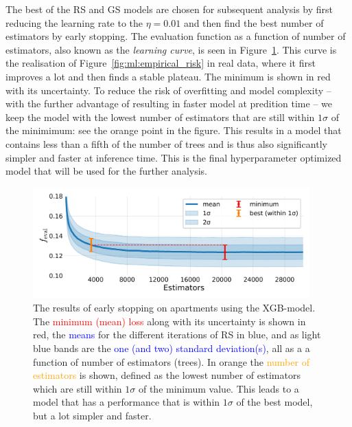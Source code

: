 The best of the RS and GS models are chosen for subsequent analysis by first reducing the learning rate to the $\eta=0.01$ and then find the best number of estimators by early stopping. The evaluation function as a function of number of estimators, also known as the \emph{learning curve}, is seen in Figure~\ref{fig:h:CV_res_ES_learning_curve_ejer}. This curve is the realisation of Figure~\ref{fig:ml:empirical_risk} in real data, where it first improves a lot and then finds a stable plateau. The minimum is shown in red with its uncertainty. To reduce the risk of overfitting and model complexity -- with the further advantage of resulting in faster model at predition time -- we keep the model with the lowest number of estimators that are still within $1\sigma$ of the minimimum: see the orange point in the figure. This results in a model that contains less than a fifth of the number of trees and is thus also significantly simpler and faster at inference time. This is the final hyperparameter optimized model that will be used for the further analysis. 

\begin{figure}
  \includegraphics[draft, width=0.95\textwidth, trim=0 0 0 0, clip]{figures/housing/Ejerlejlighed_v19_cut_all_Ncols_all_xgb_early_stopping_fig.png}
  \caption[Early Stopping results]
          {The results of early stopping on apartments using the XGB-model. The \textcolor{red}{minimum (mean) loss} along with its uncertainty is shown in red, the \textcolor{blue}{means} for the different iterations of RS in blue, and as light blue bands are the \textcolor{blue}{one (and two) standard deviation(s)}, all as a a function of number of estimators (trees). In orange the \textcolor{orange}{ number of estimators} is shown, defined as the lowest number of estimators which are still within $1\sigma$ of the minimum value. This leads to a model that has a performance that is within $1\sigma$ of the best model, but a lot simpler and faster.} 
  \label{fig:h:CV_res_ES_learning_curve_ejer}
\end{figure}










